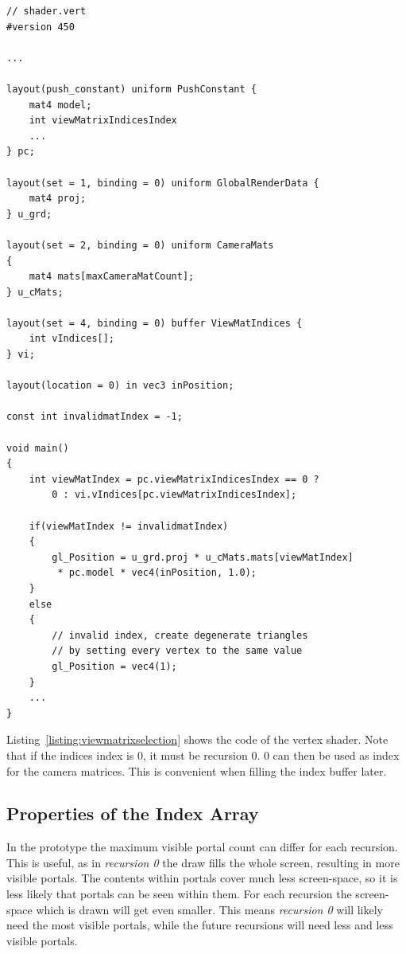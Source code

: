 \begin{lstlisting}[caption={View Matrix Selection}, label=listing:viewmatrixselection]
// shader.vert
#version 450

...

layout(push_constant) uniform PushConstant {	
	mat4 model;
	int viewMatrixIndicesIndex
	...
} pc;

layout(set = 1, binding = 0) uniform GlobalRenderData {
	mat4 proj;
} u_grd;

layout(set = 2, binding = 0) uniform CameraMats
{
	mat4 mats[maxCameraMatCount];
} u_cMats;

layout(set = 4, binding = 0) buffer ViewMatIndices {
	int vIndices[];
} vi;

layout(location = 0) in vec3 inPosition;

const int invalidmatIndex = -1;

void main()
{
	int viewMatIndex = pc.viewMatrixIndicesIndex == 0 ? 
		0 : vi.vIndices[pc.viewMatrixIndicesIndex];
	
	if(viewMatIndex != invalidmatIndex)
	{
		gl_Position = u_grd.proj * u_cMats.mats[viewMatIndex]
		 * pc.model * vec4(inPosition, 1.0);
	}
	else
	{
		// invalid index, create degenerate triangles
		// by setting every vertex to the same value
		gl_Position = vec4(1);
	}
	...
}

\end{lstlisting}

Listing~\ref{listing:viewmatrixselection} shows the code of the vertex shader. Note that if the indices index is 0, it must be recursion 0. 0 can then be used as index for the camera matrices. This is convenient when filling the index buffer later.

\subsection{Properties of the Index Array}
\label{section:indexarrayproperties}

In the prototype the maximum visible portal count can differ for each recursion. This is useful, as in \textit{recursion 0} the draw fills the whole screen, resulting in more visible portals. The contents within portals cover much less screen-space, so it is less likely that portals can be seen within them. For each recursion the screen-space which is drawn will get even smaller. This means \textit{recursion 0} will likely need the most visible portals, while the future recursions will need less and less visible portals.

